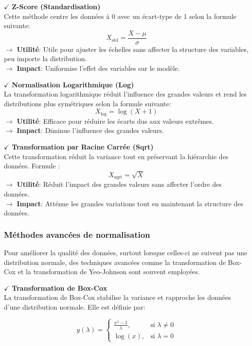 \textbf{\(\checkmark\)} \textbf{Z-Score (Standardisation)} \\
    Cette méthode centre les données à 0 avec un écart-type de 1 selon la formule suivante:
    \[
    X_{\text{std}} = \frac{X - \mu}{\sigma}
    \]
\textbf{\(\rightarrow\)} \textbf{Utilité}: Utile pour ajuster les échelles sans affecter la structure des variables, peu importe la distribution.\\
\textbf{\(\rightarrow\)} \textbf{Impact}: Uniformise l'effet des variables sur le modèle.

\textbf{\(\checkmark\)} \textbf{Normalisation Logarithmique (Log)} \\
    La transformation logarithmique réduit l'influence des grandes valeurs et rend les distributions plus symétriques selon la formule suivante: 
    \[
    X_{\text{log}} = \log(X + 1)
    \]
\textbf{\(\rightarrow\)} \textbf{Utilité}: Efficace pour réduire les écarts dus aux valeurs extrêmes.\\
\textbf{\(\rightarrow\)} \textbf{Impact}: Diminue l'influence des grandes valeurs.

\textbf{\(\checkmark\)} \textbf{Transformation par Racine Carrée (Sqrt)} \\
    Cette transformation réduit la variance tout en préservant la hiérarchie des données. Formule :
    \[
    X_{\text{sqrt}} = \sqrt{X}
    \]
\textbf{\(\rightarrow\)} \textbf{Utilité}: Réduit l'impact des grandes valeurs sans affecter l'ordre des données.\\
\textbf{\(\rightarrow\)} \textbf{Impact}: Atténue les grandes variations tout en maintenant la structure des données.

\subsubsection{Méthodes avancées de normalisation}

Pour améliorer la qualité des données, surtout lorsque celles-ci ne suivent pas une distribution normale, des techniques avancées comme la transformation de Box-Cox et la transformation de Yeo-Johnson sont souvent employées.

\textbf{\(\checkmark\)} \textbf{Transformation de Box-Cox} \\
La transformation de Box-Cox stabilise la variance et rapproche les données d'une distribution normale. Elle est définie par:

\[
y(\lambda) =
\begin{cases} 
\frac{x^\lambda - 1}{\lambda}, & \text{si } \lambda \neq 0 \\
\log(x), & \text{si } \lambda = 0
\end{cases}
\]

